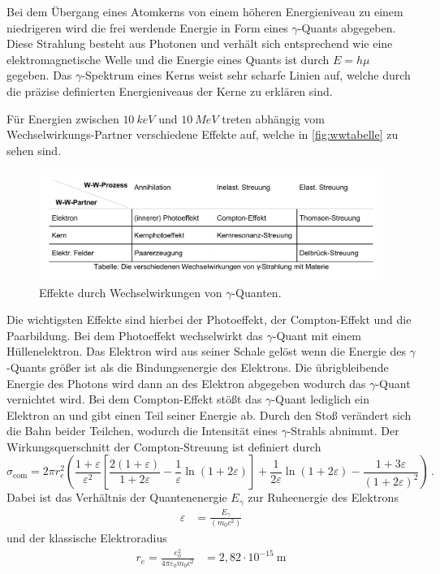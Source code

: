 Bei dem Übergang eines Atomkerns von einem höheren Energieniveau zu einem niedrigeren
wird die frei werdende Energie in Form eines $\gamma$-Quants abgegeben. 
Diese Strahlung besteht aus Photonen und verhält sich entsprechend wie eine elektromagnetische Welle 
und die Energie eines Quants ist durch $E = h \mu$ gegeben. 
Das $\gamma$-Spektrum eines Kerns weist sehr scharfe Linien auf,
welche durch die präzise definierten Energieniveaus der Kerne zu erklären sind.

Für Energien zwischen $\qty{10}{keV}$ und $\qty{10}{MeV}$ treten abhängig vom Wechselwirkungs-Partner
verschiedene Effekte auf, welche in \autoref{fig:wwtabelle} zu sehen sind.
\begin{figure}
    \centering
    \includegraphics[width=\linewidth]{pictures/wwtabelle.pdf}
    \caption{Effekte durch Wechselwirkungen von $\gamma$-Quanten. \cite{v704}}
    \label{fig:wwtabelle}
\end{figure}

Die wichtigsten Effekte sind hierbei der Photoeffekt, der Compton-Effekt und die Paarbildung. 
Bei dem Photoeffekt wechselwirkt das $\gamma$-Quant mit einem Hüllenelektron. 
Das Elektron wird aus seiner Schale gelöst wenn die Energie des $\gamma$-Quants größer ist als die Bindungsenergie des Elektrons. 
Die übrigbleibende Energie des Photons wird dann an des Elektron abgegeben wodurch das $\gamma$-Quant vernichtet wird. 
Bei dem Compton-Effekt stößt das $\gamma$-Quant lediglich ein Elektron an und gibt einen Teil seiner Energie ab. 
Durch den Stoß verändert sich die Bahn beider Teilchen, wodurch die Intensität eines $\gamma$-Strahls abnimmt. 
Der Wirkungsquerschnitt der Compton-Streuung ist definiert durch
\begin{equation} \label{eq:Compton}
    \sigma_{\text{com}} = 
    2 \pi r_{e}^{2} 
    \left(
        \frac{1+\varepsilon}{\varepsilon^{2}} 
        \left[
              \frac{2(1+\varepsilon)}{1+2 \varepsilon}-\frac{1}{\varepsilon} \ln (1+2 \varepsilon) 
        \right] 
        +\frac{1}{2 \varepsilon} \ln (1+2 \varepsilon)-\frac{1+3 \varepsilon}{(1+2 \varepsilon)^{2}}
    \right) \, .
\end{equation}
Dabei ist das Verhältnis der Quantenenergie $E_\gamma$ zur Ruheenergie des Elektrons 
\begin{align*}
    \varepsilon &= \frac{E_\gamma}{(m_0 c^2)} 
\end{align*}
und der klassische Elektroradius
\begin{align*}
    r_{e} = \frac{e_{0}^{2}}{4 \pi \varepsilon_{0} m_{0} c^{2}} &= 2,82 \cdot 10^{-15} \mathrm{~m}
\end{align*}

